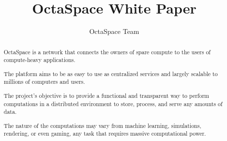 \documentclass[a4paper]{article}
\begin{document}
\title{OctaSpace White Paper}

\author{OctaSpace Team}

\maketitle

\tableofcontents
\newpage

\begin{abstract}
OctaSpace is a network that connects the owners of spare compute to the users of compute-heavy applications.

The platform aims to be as easy to use as centralized services and largely scalable to millions of computers and users.

The project's objective is to provide a functional and transparent way to perform computations in a distributed environment to store, process, and serve any amounts of data.

The nature of the computations may vary from machine learning, simulations, rendering, or even gaming, any task that requires massive computational power.
\end{abstract}
\newpage


\newpage

\newpage

\newpage

\newpage

\newpage




\end{document}
